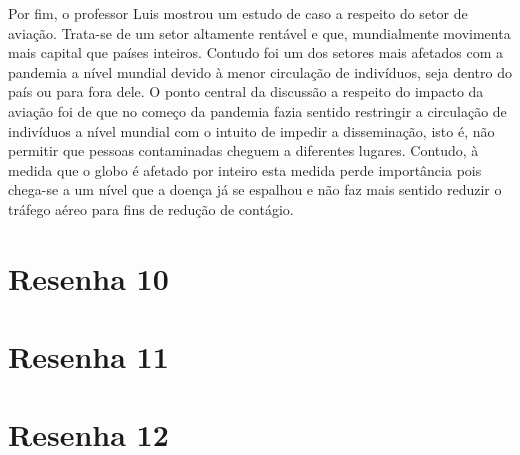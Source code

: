 \documentclass[
	12pt,				%
	openright,			%
	twoside,			%
	a4paper,			%
	english,			%
	brazil,				%
	svgnames
	]{abntex2}\usepackage[]{graphicx}\usepackage[]{color}
\begin{document}
Por fim, o professor Luis mostrou um estudo de caso a respeito do setor de aviação. Trata-se de um setor altamente rentável e que, mundialmente movimenta mais capital que países inteiros. Contudo foi um dos setores mais afetados com a pandemia a nível mundial devido à menor circulação de indivíduos, seja dentro do país ou para fora dele. O ponto central da discussão a respeito do impacto da aviação foi de que no começo da pandemia fazia sentido restringir a circulação de indivíduos a nível mundial com o intuito de impedir a disseminação, isto é, não permitir que pessoas contaminadas cheguem a diferentes lugares. Contudo, à medida que o globo é afetado por inteiro esta medida perde importância pois chega-se a um nível que a doença já se espalhou e não faz mais sentido reduzir o tráfego aéreo para fins de redução de contágio.



\chapter{Resenha 10}
\label{cap:res10}

% 


\chapter{Resenha 11}
\label{cap:res11}

% 


\chapter{Resenha 12}
\label{cap:res12}

% 




\postextual

\end{document}
